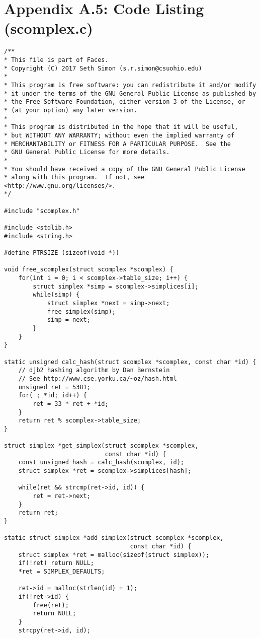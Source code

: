 \documentclass{article}
\begin{document}
\section{Appendix A.5: Code Listing (scomplex.c)}
\small
\begin{verbatim}
/**
* This file is part of Faces.
* Copyright (C) 2017 Seth Simon (s.r.simon@csuohio.edu)
* 
* This program is free software: you can redistribute it and/or modify
* it under the terms of the GNU General Public License as published by
* the Free Software Foundation, either version 3 of the License, or
* (at your option) any later version.
* 
* This program is distributed in the hope that it will be useful,
* but WITHOUT ANY WARRANTY; without even the implied warranty of
* MERCHANTABILITY or FITNESS FOR A PARTICULAR PURPOSE.  See the
* GNU General Public License for more details.
* 
* You should have received a copy of the GNU General Public License
* along with this program.  If not, see <http://www.gnu.org/licenses/>.
*/

#include "scomplex.h"

#include <stdlib.h>
#include <string.h>

#define PTRSIZE (sizeof(void *))

void free_scomplex(struct scomplex *scomplex) {
    for(int i = 0; i < scomplex->table_size; i++) {
        struct simplex *simp = scomplex->simplices[i];
        while(simp) {
            struct simplex *next = simp->next;
            free_simplex(simp);
            simp = next;
        }
    }
}

static unsigned calc_hash(struct scomplex *scomplex, const char *id) {
    // djb2 hashing algorithm by Dan Bernstein
    // See http://www.cse.yorku.ca/~oz/hash.html
    unsigned ret = 5381;
    for( ; *id; id++) {
        ret = 33 * ret + *id;
    }
    return ret % scomplex->table_size;
}

struct simplex *get_simplex(struct scomplex *scomplex,
                            const char *id) {
    const unsigned hash = calc_hash(scomplex, id);
    struct simplex *ret = scomplex->simplices[hash];

    while(ret && strcmp(ret->id, id)) {
        ret = ret->next;
    }
    return ret;
}

static struct simplex *add_simplex(struct scomplex *scomplex,
                                   const char *id) {
    struct simplex *ret = malloc(sizeof(struct simplex));
    if(!ret) return NULL;
    *ret = SIMPLEX_DEFAULTS;

    ret->id = malloc(strlen(id) + 1);
    if(!ret->id) {
        free(ret);
        return NULL;
    }
    strcpy(ret->id, id);


\end{verbatim}
\end{document}
